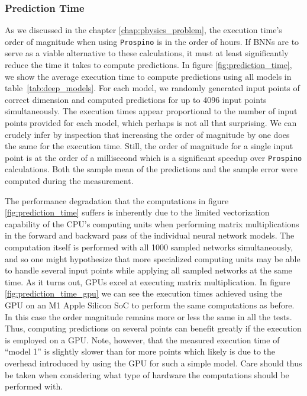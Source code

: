 \subsubsection{Prediction Time}
As we discussed in the chapter \ref{chap:physics_problem}, the execution time's order of magnitude when using {\tt Prospino} is in the order of hours. 
If BNNs are to serve as a viable alternative to these calculations, it must at least significantly reduce the time it takes to compute predictions. In figure \ref{fig:prediction_time}, we 
show the average execution time to compute predictions using all models in table~\ref{tab:deep_models}.
For each model, we randomly generated input points of correct dimension and computed predictions for up to 4096 input points simultaneously.
The execution times appear proportional to the number of input points provided for each model, which perhaps is not all that surprising. We can crudely infer by inspection that increasing the order of magnitude by one does the same for the execution time. Still, the order of magnitude for a single input point is at the order of a millisecond which is a significant speedup over {\tt Prospino} calculations. Both the sample mean of the predictions and the sample error were computed during the measurement. 

The performance degradation that the computations in figure \ref{fig:prediction_time} suffers is inherently due to the limited vectorization capability of the CPU's computing units when performing matrix multiplications in the forward and backward pass of the individual neural network models. The computation itself is performed with all 1000 sampled networks simultaneously, and so one might hypothesize that more specialized computing units may be able to handle several input points while applying all sampled networks at the same time. As it turns out, GPUs excel at executing matrix multiplication. In figure \ref{fig:prediction_time_gpu} we can see the execution times achieved using the GPU on an M1 Apple Silicon SoC to perform the same computations as before. In this case the order magnitude remains more or less the same in all the tests. Thus, computing predictions on several points can benefit greatly if the execution is employed on a GPU. Note, however, that the measured execution time of ``model 1'' is slightly slower than for more points which likely is due to the overhead introduced by using the GPU for such a simple model. Care should thus be taken when considering what type of hardware the computations should be performed with.


